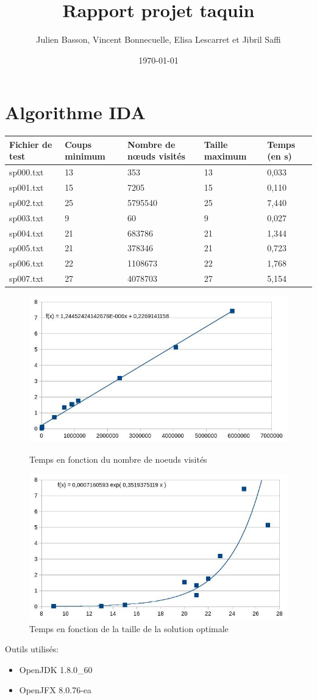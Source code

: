 \documentclass{article}
\title{Rapport projet taquin}
\author{Julien Basson, Vincent Bonnecuelle, Elisa Lescarret et Jibril Saffi}
\date{\today}
\begin{document}
\maketitle
\section{Algorithme IDA\up{*}}
\begin{center}
\begin{tabular}{lllll}
    \toprule
    Fichier de test & Coups minimum & Nombre de nœuds visités & Taille maximum & Temps (en s)\\
    \midrule
    sp000.txt & 13 & 353     & 13 & 0,033\\
    sp001.txt & 15 & 7205    & 15 & 0,110\\
    sp002.txt & 25 & 5795540 & 25 & 7,440\\
    sp003.txt & 9  & 60      & 9  & 0,027\\
    sp004.txt & 21 & 683786  & 21 & 1,344\\
    sp005.txt & 21 & 378346  & 21 & 0,723\\
    sp006.txt & 22 & 1108673 & 22 & 1,768\\
    sp007.txt & 27 & 4078703 & 27 & 5,154\\
    \bottomrule
\end{tabular}
\end{center}
\begin{figure}[h]
\begin{minipage}{0.5\linewidth}
    \centering
    \includegraphics[width=0.8\linewidth]{time_v_nodes.png}
    \caption{Temps en fonction du nombre de noeuds visités}
\end{minipage}
\hspace{1cm}
\begin{minipage}{0.5\linewidth}
    \centering
    \includegraphics[width=0.8\linewidth]{time_v_solution_size.png}
    \caption{Temps en fonction de la taille de la solution optimale}
\end{minipage}
\end{figure}
Outils utilisés:
\begin{itemize}
    \item OpenJDK 1.8.0\_60
    \item OpenJFX 8.0.76\--ea
\end{itemize}
\end{document}
